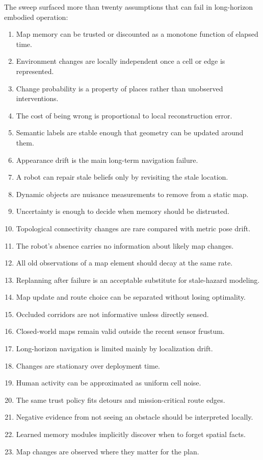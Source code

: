 \documentclass{article}
\begin{document}
The sweep surfaced more than twenty assumptions that can fail in long-horizon embodied operation:
\begin{enumerate}
\item Map memory can be trusted or discounted as a monotone function of elapsed time.
\item Environment changes are locally independent once a cell or edge is represented.
\item Change probability is a property of places rather than unobserved interventions.
\item The cost of being wrong is proportional to local reconstruction error.
\item Semantic labels are stable enough that geometry can be updated around them.
\item Appearance drift is the main long-term navigation failure.
\item A robot can repair stale beliefs only by revisiting the stale location.
\item Dynamic objects are nuisance measurements to remove from a static map.
\item Uncertainty is enough to decide when memory should be distrusted.
\item Topological connectivity changes are rare compared with metric pose drift.
\item The robot's absence carries no information about likely map changes.
\item All old observations of a map element should decay at the same rate.
\item Replanning after failure is an acceptable substitute for stale-hazard modeling.
\item Map update and route choice can be separated without losing optimality.
\item Occluded corridors are not informative unless directly sensed.
\item Closed-world maps remain valid outside the recent sensor frustum.
\item Long-horizon navigation is limited mainly by localization drift.
\item Changes are stationary over deployment time.
\item Human activity can be approximated as uniform cell noise.
\item The same trust policy fits detours and mission-critical route edges.
\item Negative evidence from not seeing an obstacle should be interpreted locally.
\item Learned memory modules implicitly discover when to forget spatial facts.
\item Map changes are observed where they matter for the plan.
\end{enumerate}
\end{document}
